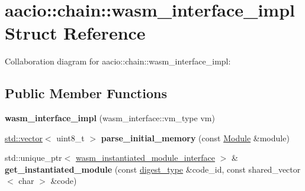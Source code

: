 \hypertarget{structaacio_1_1chain_1_1wasm__interface__impl}{}\section{aacio\+:\+:chain\+:\+:wasm\+\_\+interface\+\_\+impl Struct Reference}
\label{structaacio_1_1chain_1_1wasm__interface__impl}


Collaboration diagram for aacio\+:\+:chain\+:\+:wasm\+\_\+interface\+\_\+impl\+:
\subsection*{Public Member Functions}
\begin{DoxyCompactItemize}
\item 
\mbox{\label{structaacio_1_1chain_1_1wasm__interface__impl_ad49c899fb876ec700f8db43aad11283b}} 
{\bfseries wasm\+\_\+interface\+\_\+impl} (wasm\+\_\+interface\+::vm\+\_\+type vm)
\item 
\mbox{\label{structaacio_1_1chain_1_1wasm__interface__impl_ad8bb0db82c1bfb97e08cb0b9d9998d79}} 
\mbox{\hyperlink{classstd_1_1vector}{std\+::vector}}$<$ uint8\+\_\+t $>$ {\bfseries parse\+\_\+initial\+\_\+memory} (const \mbox{\hyperlink{struct_i_r_1_1_module}{Module}} \&module)
\item 
\mbox{\label{structaacio_1_1chain_1_1wasm__interface__impl_a6fb14f911e6831889d172b2c248b417e}} 
std\+::unique\+\_\+ptr$<$ \mbox{\hyperlink{classaacio_1_1chain_1_1wasm__instantiated__module__interface}{wasm\+\_\+instantiated\+\_\+module\+\_\+interface}} $>$ \& {\bfseries get\+\_\+instantiated\+\_\+module} (const \mbox{\hyperlink{classfc_1_1sha256}{digest\+\_\+type}} \&code\+\_\+id, const shared\+\_\+vector$<$ char $>$ \&code)
\end{DoxyCompactItemize}
